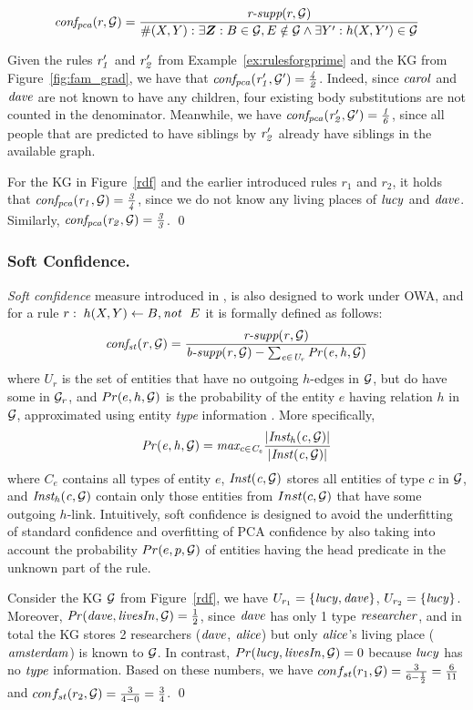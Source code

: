 \[
\mi{conf_{pca}}(r, \cG) = \frac{\textit{r-supp}(r, \cG)}{\#(X,Y): \exists \vec{Z}: B \in \cG, E \notin \cG  \wedge \exists Y': h(X,Y')\in \cG}
\]
\begin{example}
Given the rules $\mathit{r_1'}$ and $\mathit{r_2'}$ from Example~\ref{ex:rulesforgprime} and the KG from Figure~\ref{fig:fam_grad}, we have that $\mathit{conf_{pca}(r_1',\mathcal{G}') = \frac{4}{2}}$. Indeed, since $\mathit{carol}$ and $\mathit{dave}$ are not known
to have any children, four existing body substitutions are not counted in the
denominator. Meanwhile, we have $\mathit{conf_{pca}(r_2', \mathcal{G}') = \frac{1}{6}}$, since all people that are predicted to have siblings by $\mathit{r_2'}$ already have siblings in the available graph.

For the KG in Figure~\ref{rdf} and the earlier introduced rules $r_1$ and $r_2$, it holds that $\mathit{conf_{pca}(r_1,\mathcal{G}) = \frac{3}{4}}$, since we do not know any living places of $\mathit{lucy}$ and $\mathit{dave}$. Similarly, $\mathit{conf_{pca}(r_2,\mathcal{G}) = \frac{3}{3}}$. \qed
\end{example}

\subsubsection{Soft Confidence.} \emph{Soft confidence} measure introduced in \cite{rdf2rules}, is also designed to work under OWA, and for a rule $r:\;h(X,Y)\leftarrow B, \mathit{not}~ \; E$ it is formally defined as follows:
\[\mathit{conf_{st}(r, \mathcal{G}) = \frac{\textit{r-supp}(r, \mathcal{G})}{\textit{b-supp}(r,\mathcal{G}) - \sum_{e \in U_r}Pr(e,h,\mathcal{G})}} \]
where $U_r$ is the set of entities %
that have no outgoing %
$h$-edges in $\mathcal{G}$, but do have some in $\mathcal{G}_r$, and $Pr(e,h,\mathcal{G})$ is the probability of the entity $e$ having relation $h$ in $\mathcal{G}$, approximated using entity \textit{type} information \cite{rdf2rules}. More specifically,
\[\mathit{Pr(e,h,\mathcal{G})  = max_{c \in C_{e}}\frac{|Inst_h(c, \mathcal{G})|}{|Inst(c, \mathcal{G})|}{}}\]
where $C_{e}$ contains all types of entity $e$, $\mathit{Inst(c, \mathcal{G})}$ stores all entities of type $c$ in $\mathcal{G}$, and $\mathit{Inst_h(c, \mathcal{G})}$ contain only those entities from $Inst(c, \mathcal{G})$ that have some outgoing $h$-link.
Intuitively, soft confidence is designed to avoid the underfitting of standard confidence and overfitting of PCA confidence by also taking into account the probability  $Pr(e,p, \mathcal{G})$ of entities having the head predicate in the unknown part of the rule.
\begin{example}
Consider the KG $\mathcal{G}$ from Figure~\ref{rdf}, we have $U_{r_1} = \{\mathit{lucy, dave}\}$, $U_{r_2} = \{\mathit{lucy}\}$. Moreover, $\mathit{Pr(dave,livesIn,\mathcal{G})} = \frac{1}{2}$, since $\mathit{dave}$ has only 1 type $\mathit{researcher}$, and in total the KG stores 
2 researchers ($\mathit{dave}$, $\mathit{alice}$) but only $\mathit{alice}$'s living place ($\mathit{amsterdam}$) is known to $\mathcal{G}$. In contrast, $Pr(\mathit{lucy,livesIn,\mathcal{G}}) = 0$ because $\mathit{lucy}$ has no $\mathit{type}$ information.
Based on these numbers, we have $conf_{st}(r_1,\mathcal{G}) = \frac{3}{6-\frac{1}{2}} = \frac{6}{11}$ and $conf_{st}(r_2,\mathcal{G}) = \frac{3}{4-0} = \frac{3}{4}$.
\qed
\end{example}

